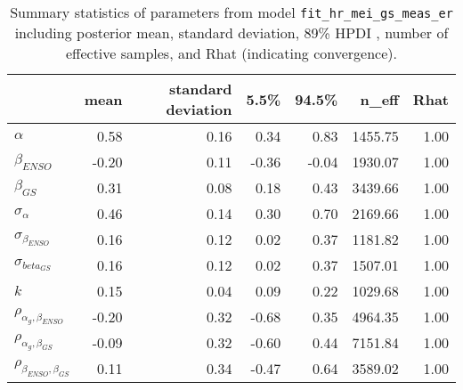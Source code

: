 \begin{table}[ht]
\centering
\begin{tabular}{lrrrrrr}
  \hline
 & mean & standard deviation & 5.5\% & 94.5\% & n\_eff & Rhat \\ 
  \hline
$\alpha$ & 0.58 & 0.16 & 0.34 & 0.83 & 1455.75 & 1.00 \\ 
  $\beta_{ENSO}$ & -0.20 & 0.11 & -0.36 & -0.04 & 1930.07 & 1.00 \\ 
  $\beta_{GS}$ & 0.31 & 0.08 & 0.18 & 0.43 & 3439.66 & 1.00 \\ 
  $\sigma_{\alpha}$ & 0.46 & 0.14 & 0.30 & 0.70 & 2169.66 & 1.00 \\ 
  $\sigma_{\beta_{ENSO}}$ & 0.16 & 0.12 & 0.02 & 0.37 & 1181.82 & 1.00 \\ 
  $\sigma_{beta_{GS}}$ & 0.16 & 0.12 & 0.02 & 0.37 & 1507.01 & 1.00 \\ 
  $k$ & 0.15 & 0.04 & 0.09 & 0.22 & 1029.68 & 1.00 \\ 
  $\rho_{\alpha_g,\beta_{ENSO}}$ & -0.20 & 0.32 & -0.68 & 0.35 & 4964.35 & 1.00 \\ 
  $\rho_{\alpha_g,\beta_{GS}}$ & -0.09 & 0.32 & -0.60 & 0.44 & 7151.84 & 1.00 \\ 
  $\rho_{\beta_{ENSO},\beta_{GS}}$ & 0.11 & 0.34 & -0.47 & 0.64 & 3589.02 & 1.00 \\ 
   \hline
\end{tabular}
\caption{Summary statistics of parameters from model  \texttt{fit\_hr\_mei\_gs\_meas\_er} including posterior mean, standard deviation, 89\% HPDI , number of effective samples, and Rhat (indicating convergence).} 
\label{tab:precis_hr_mei_gs_me}
\end{table}
